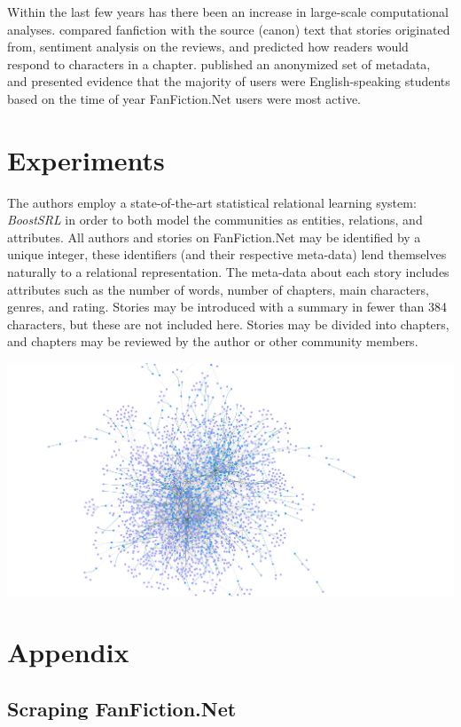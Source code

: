 \documentclass[letterpaper]{article}
\begin{document}
Within the last few years has there been an increase in large-scale computational analyses. \cite{milli2016beyond} compared fanfiction with the source (canon) text that stories originated from, sentiment analysis on the reviews, and predicted how readers would respond to characters in a chapter. \cite{yin2017no} published an anonymized set of metadata, and presented evidence that the majority of users were English-speaking students based on the time of year FanFiction.Net users were most active.

\section{Experiments}

The authors employ a state-of-the-art statistical relational learning system: \textit{BoostSRL} in order to both model the communities as entities, relations, and attributes. All authors and stories on FanFiction.Net may be identified by a unique integer, these identifiers (and their respective meta-data) lend themselves naturally to a relational representation. The meta-data about each story includes attributes such as the number of words, number of chapters, main characters, genres, and rating. Stories may be introduced with a summary in fewer than 384 characters, but these are not included here. Stories may be divided into chapters, and chapters may be reviewed by the author or other community members.

\includegraphics[scale=0.05]{Coraline_network.png}

\section{Appendix}

\subsection{Scraping FanFiction.Net}
\end{document}
